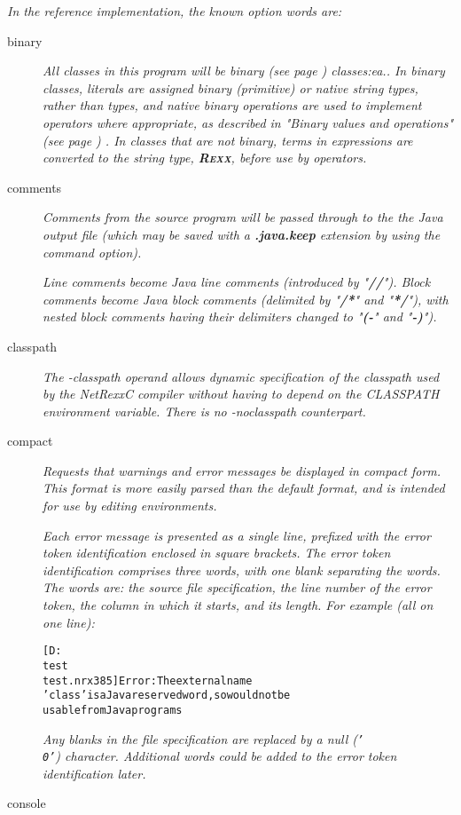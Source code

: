 \emph{In the reference implementation, the known option words are:}
\begin{description}
\item[binary]
\emph{All classes in this program will be  binary (see page \pageref{refbincla}) 
classes:ea..
In binary classes, literals are assigned binary (primitive) or native
string types, rather than \nr{} types, and native binary operations
are used to implement operators where appropriate, as described in
 "\emph{Binary values and operations}" (see page \pageref{refbinary}) .
In classes that are not binary, terms in expressions are converted to
the \nr{} string type, \textbf{R\textsc{exx}}, before use by operators.}
\item[comments]

\emph{Comments from the \nr{} source program will be passed through to the
the Java output file (which may be saved with a \textbf{.java.keep}
extension by using the  command option).}
 
\emph{Line comments become Java line comments (introduced by
"\textbf{//}").
Block comments become Java block comments (delimited by
"\textbf{/*}" and "\textbf{*/}"), with nested block
comments having their delimiters changed to "\textbf{(-}" and
"\textbf{-)}").}

\item[classpath]
\emph{The \emph{-classpath} operand allows dynamic specification of the
  classpath used by the NetRexxC compiler without having to depend on
  the CLASSPATH environment variable. There is no -noclasspath counterpart.}

\item[compact]

\emph{Requests that warnings and error messages be displayed in compact
form.  This format is more easily parsed than the default format, and
is intended for use by editing environments.}
 
\emph{Each error message is presented as a single line, prefixed with the
error token identification enclosed in square brackets.
The error token identification comprises three words, with one blank
separating the words.  The words are: the source file specification, the
line number of the error token, the column in which it starts, and its
length.  For example (all on one line):}
\begin{alltt}
[D:\\test\\test.nrx 3 8 5] Error: The external name
'class' is a Java reserved word, so would not be
usable from Java programs
\end{alltt}
\emph{Any blanks in the file specification are replaced by a null
(\texttt{'\\0'}) character.  Additional words could be added to the error
token identification later.}
\item[console]


\end{description}
